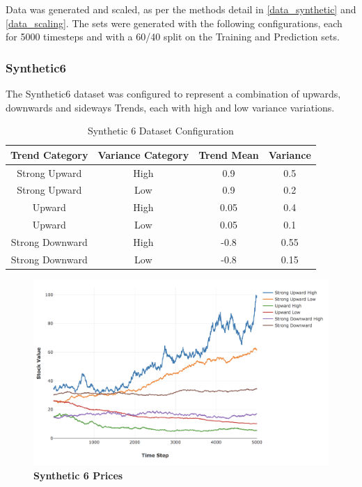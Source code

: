 \documentclass[a4paper,11pt,oneside]{article}
\theoremstyle{plain}
\theoremstyle{definition}
\begin{document}
Data was generated and scaled, as per the methods detail in \ref{data_synthetic} and \ref{data_scaling}. The sets were generated with the following configurations, each for 5000 timesteps and with a 60/40 split on the Training and Prediction sets.

\subsubsection{Synthetic6} \label{dataset_synthetic6}

The Synthetic6 dataset was configured to represent a combination of upwards, downwards and sideways Trends, each with high and low variance variations.

\begin{table}[h]
	\centering
	\begin{tabular}{|c|c|c|c|}
		\hline
		\textbf{Trend Category} &\textbf{Variance Category} & \textbf{Trend Mean} & \textbf{Variance}\\\hline	
		{Strong Upward} & {High} & {0.9} & {0.5} \\\hline
		{Strong Upward} & {Low} & {0.9} & {0.2} \\\hline
		{Upward} & {High} & {0.05} & {0.4} \\\hline
		{Upward} & {Low} & {0.05} & {0.1} \\\hline
		{Strong Downward} & {High} & {-0.8} & {0.55} \\\hline
		{Strong Downward} & {Low} & {-0.8} & {0.15} \\\hline
	\end{tabular}
	\newline\newline
	\caption{Synthetic 6 Dataset Configuration}\label{tab_synth6}
\end{table}

\begin{figure}[H]
	\centering
	\includegraphics[scale=0.35]{images/results/prices/synthetic6_prices.png} 
	\caption[Synthetic 6 Prices]{\textbf{Synthetic 6 Prices}}
	\label{figure-synthetic6_prices}
\end{figure}
\end{document}
